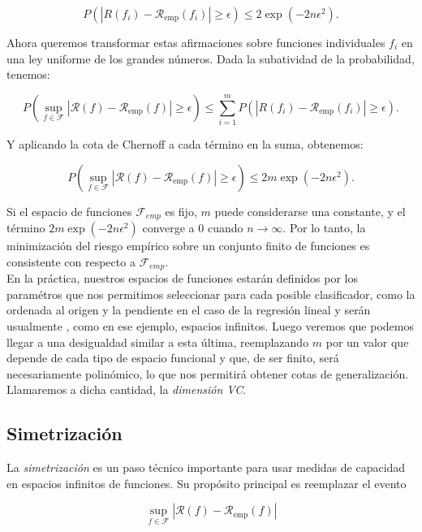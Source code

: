 \documentclass{article}
\begin{document}
\[
P\left(|R(f_i) - \mathcal{R}_{\text{emp}}(f_i)| \geq \epsilon \right) \leq 2 \exp(-2n\epsilon^2).
\]

Ahora queremos transformar estas afirmaciones sobre funciones individuales \(f_i\) en una ley uniforme de los 
grandes números. Dada la subatividad de la probabilidad, tenemos:

\[
P\left(\sup_{f \in \mathcal{F}} |\mathcal{R}(f) - \mathcal{R}_{\text{emp}}(f)| \geq \epsilon \right) \leq \sum_{i=1}^m P\left(|R(f_i) - \mathcal{R}_{\text{emp}}(f_i)| \geq \epsilon \right).
\]

Y aplicando la cota de Chernoff a cada término en la suma, obtenemos:

\begin{equation}
P\left(\sup_{f \in \mathcal{F}} |\mathcal{R}(f) - \mathcal{R}_{\text{emp}}(f)| \geq \epsilon \right) \leq 2m \exp(-2n\epsilon^2). \label{eq: chernoff acotada por m}
\end{equation}

Si el espacio de funciones \(\mathcal{F}_{emp}\) es fijo, \(m\) puede considerarse una 
constante, y el término \(2m \exp(-2n\epsilon^2)\) converge a \(0\) cuando \(n \to \infty\). Por lo tanto,
la minimización del riesgo empírico sobre un conjunto finito de funciones es consistente con respecto 
a \(\mathcal{F}_{emp}\). \\

En la práctica, nuestros espacios de funciones estarán definidos por los paramétros que nos permitimos 
seleccionar para cada posible clasificador, como la ordenada al origen y la pendiente en el caso de la regresión lineal y serán usualmente
, como en ese ejemplo,
espacios infinitos. Luego veremos que podemos llegar a una desigualdad similar a esta última, reemplazando $m$ por un valor que depende
de cada tipo de espacio funcional y que, de ser finito, será necesariamente polinómico, lo que nos permitirá obtener cotas de generalización.
Llamaremos a dicha cantidad, la \textit{dimensión VC}.\newline

\subsection{Simetrización}

La \textit{simetrización} es un paso técnico importante para usar medidas de capacidad en espacios infinitos de 
funciones. Su propósito principal es reemplazar el evento 

\[
\sup_{f \in \mathcal{F}} |\mathcal{R}(f) - \mathcal{R}_{\text{emp}}(f)|
\]
\end{document}
